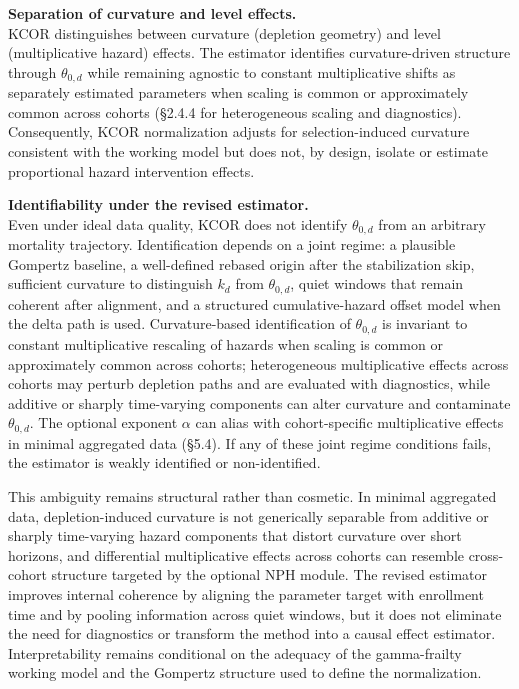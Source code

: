 \documentclass[
]{article}
\begin{document}
\textbf{Separation of curvature and level effects.}\\
KCOR distinguishes between curvature (depletion geometry) and level
(multiplicative hazard) effects. The estimator identifies
curvature-driven structure through \(\theta_{0,d}\) while remaining
agnostic to constant multiplicative shifts as separately estimated
parameters when scaling is common or approximately common across cohorts
(§2.4.4 for heterogeneous scaling and diagnostics). Consequently, KCOR
normalization adjusts for selection-induced curvature consistent with
the working model but does not, by design, isolate or estimate
proportional hazard intervention effects.

\textbf{Identifiability under the revised estimator.}\\
Even under ideal data quality, KCOR does not identify \(\theta_{0,d}\)
from an arbitrary mortality trajectory. Identification depends on a
joint regime: a plausible Gompertz baseline, a well-defined rebased
origin after the stabilization skip, sufficient curvature to distinguish
\(k_d\) from \(\theta_{0,d}\), quiet windows that remain coherent after
alignment, and a structured cumulative-hazard offset model when the
delta path is used. Curvature-based identification of \(\theta_{0,d}\)
is invariant to constant multiplicative rescaling of hazards when
scaling is common or approximately common across cohorts; heterogeneous
multiplicative effects across cohorts may perturb depletion paths and
are evaluated with diagnostics, while additive or sharply time-varying
components can alter curvature and contaminate \(\theta_{0,d}\). The
optional exponent \(\alpha\) can alias with cohort-specific
multiplicative effects in minimal aggregated data (§5.4). If any of
these joint regime conditions fails, the estimator is weakly identified
or non-identified.

This ambiguity remains structural rather than cosmetic. In minimal
aggregated data, depletion-induced curvature is not generically
separable from additive or sharply time-varying hazard components that
distort curvature over short horizons, and differential multiplicative
effects across cohorts can resemble cross-cohort structure targeted by
the optional NPH module. The revised estimator improves internal
coherence by aligning the parameter target with enrollment time and by
pooling information across quiet windows, but it does not eliminate the
need for diagnostics or transform the method into a causal effect
estimator. Interpretability remains conditional on the adequacy of the
gamma-frailty working model and the Gompertz structure used to define
the normalization.
\end{document}
